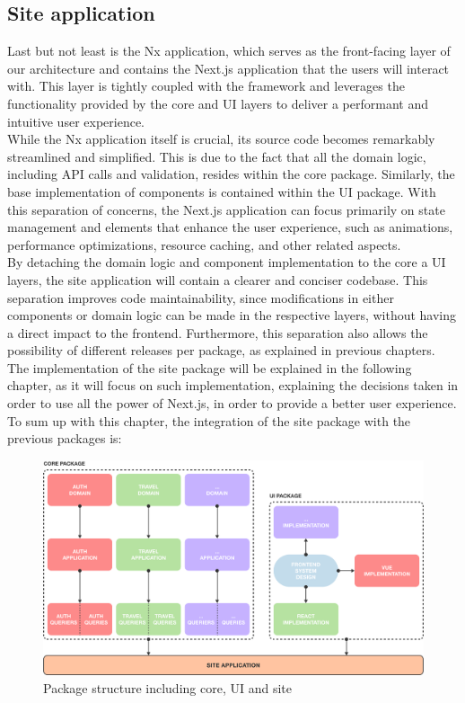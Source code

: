 \documentclass[../design.tex]{subfiles}
\begin{document}
\subsection{Site application}
Last but not least is the Nx application, which serves as the front-facing layer
of our architecture and contains the Next.js application that the users will
interact with. This layer is tightly coupled with the framework and leverages
the functionality provided by the core and UI layers to deliver a performant and
intuitive user experience.
\\[8pt]
While the Nx application itself is crucial, its source code becomes remarkably
streamlined and simplified. This is due to the fact that all the domain logic,
including API calls and validation, resides within the core package. Similarly,
the base implementation of components is contained within the UI package. With
this separation of concerns, the Next.js application can focus primarily on
state management and elements that enhance the user experience, such as
animations, performance optimizations, resource caching, and other related
aspects.
\\
By detaching the domain logic and component implementation to the core a UI
layers, the site application will contain a clearer and conciser codebase. This
separation improves code maintainability, since modifications in either
components or domain logic can be made in the respective layers, without having
a direct impact to the frontend. Furthermore, this separation also allows the
possibility of different releases per package, as explained in previous
chapters.
\\[8pt]
The implementation of the site package will be explained in the following
chapter, as it will focus on such implementation, explaining the decisions taken
in order to use all the power of Next.js, in order to provide a better user
experience. To sum up with this chapter, the integration of the site package
with the previous packages is:
\begin{figure}[H]
	\centering
	\includegraphics[width=\textwidth]{./assets/ui-core-site.png}
	\caption{Package structure including core, UI and site}
\end{figure}
\end{document}
